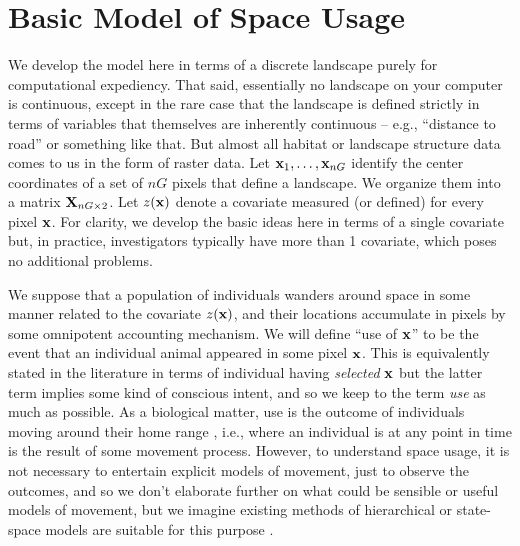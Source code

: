 \section{Basic Model of Space Usage}
\label{rsf.sec.rsfmodel}

We develop the model here in terms of a discrete landscape purely for
computational expediency. That said, essentially no landscape on your
computer is continuous, except in the rare case that the landscape is
defined strictly in terms of variables that themselves are inherently
continuous -- e.g., ``distance to road'' or something like that.  But
almost all habitat or landscape structure data comes to us in the form
of raster data.  Let ${\bf x}_{1},\ldots,{\bf x}_{nG}$ identify the
center coordinates of a set of $nG$ pixels that define a landscape.
We organize them into a matrix ${\bf X}_{nG \times 2}$.  Let $z({\bf
  x})$ denote a covariate measured (or defined) for every pixel ${\bf
  x}$. For clarity, we develop the basic ideas here in terms of a
single covariate but, in practice, investigators typically have more
than 1 covariate, which poses no additional problems.

We suppose that a population of individuals wanders around space in
some manner related to the covariate $z({\bf x})$, and their locations
accumulate in pixels by some omnipotent accounting mechanism. We will
define ``use of ${\bf x}$'' to be the event that an individual animal
appeared in some pixel ${\bf x}$. This is equivalently stated in the
literature in terms of individual having {\it selected} ${\bf x}$ but
the latter term implies some kind of conscious intent, and so we keep
to the term {\it use} as much as possible.  As a biological matter,
use is the outcome of individuals moving around their home range \citep{hooten_etal:2010},
i.e., where an individual is at any point in time is the result of
some movement process. However, to understand space usage, it is not
necessary to entertain explicit models of movement, just to observe
the outcomes, and so we don't elaborate further on what could be
sensible or useful models of movement, but we imagine existing methods
of hierarchical or state-space
models are suitable for this purpose \citep{jonsen_etal:2005,
  forester_etal:2007, patterson_etal:2008, hooten_etal:2010, mcclintock_etal:2012}.





